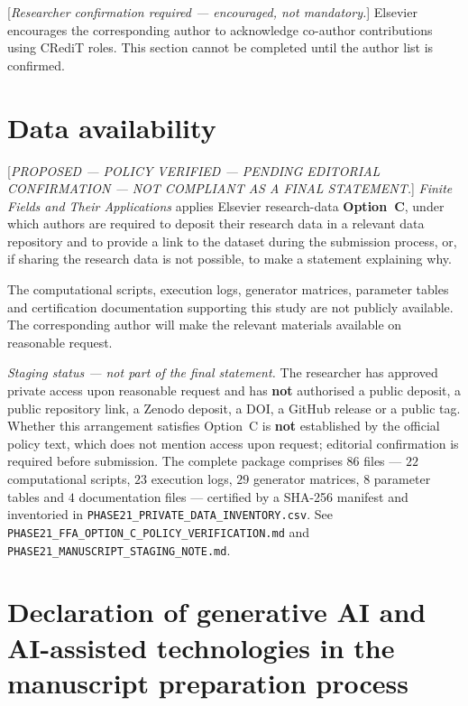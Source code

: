 \documentclass[11pt,a4paper]{article}
\theoremstyle{plain}
\theoremstyle{definition}
\theoremstyle{remark}
\begin{document}
[\emph{Researcher confirmation required --- encouraged, not mandatory.}] Elsevier
encourages the corresponding author to acknowledge co-author contributions
using CRediT roles. This section cannot be completed until the author list is
confirmed.

\section*{Data availability}
\label{sec:dataavailability}

[\emph{PROPOSED --- POLICY VERIFIED --- PENDING EDITORIAL CONFIRMATION ---
NOT COMPLIANT AS A FINAL STATEMENT.}] \emph{Finite Fields and Their
Applications} applies Elsevier research-data \textbf{Option~C}, under which
authors are required to deposit their research data in a relevant data
repository and to provide a link to the dataset during the submission process,
or, if sharing the research data is not possible, to make a statement
explaining why.

The computational scripts, execution logs, generator matrices, parameter
tables and certification documentation supporting this study are not publicly
available. The corresponding author will make the relevant materials available
on reasonable request.

\emph{Staging status --- not part of the final statement.} The researcher has
approved private access upon reasonable request and has \textbf{not} authorised
a public deposit, a public repository link, a Zenodo deposit, a DOI, a GitHub
release or a public tag. Whether this arrangement satisfies Option~C is
\textbf{not} established by the official policy text, which does not mention
access upon request; editorial confirmation is required before submission. The
complete package comprises $86$ files --- $22$ computational scripts,
$23$ execution logs, $29$ generator matrices, $8$ parameter tables and
$4$ documentation files --- certified by a SHA-256 manifest and inventoried in
\texttt{PHASE21\_PRIVATE\_DATA\_INVENTORY.csv}. See
\texttt{PHASE21\_FFA\_OPTION\_C\_}\texttt{POLICY\_VERIFICATION.md} and
\texttt{PHASE21\_}\texttt{MANUSCRIPT\_}\texttt{STAGING\_NOTE.md}.

\section*{Declaration of generative AI and AI-assisted technologies in the
manuscript preparation process}
\label{sec:genai}
\end{document}

